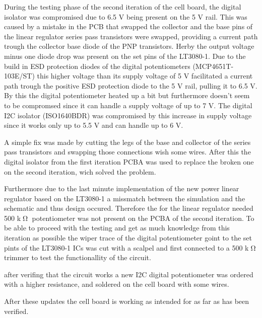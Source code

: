 
During the testing phase of the second iteration of the cell board, the digital isolator was compromised due to 6.5 V being present on the 5 V rail. This was caused by a mistake in the PCB that swapped the collector and the base pins of the linear regulator series pass transistors were swapped, providing a current path trough the collector base diode of the PNP transistors. Herby the output voltage minus one diode drop was present on the set pins of the LT3080-1. Due to the build in ESD protection diodes of the digital potentiometers (MCP4651T-103E/ST) this higher voltage than its supply voltage of 5 V facilitated a current path trough the positive ESD protection diode to the 5 V rail, pulling it to 6.5 V. By this the digital potentiometer heated up a bit but furthermore doesn't seem to be compromsed since it can handle a supply voltage of up to 7 V. The digital I2C isolator (ISO1640BDR) was compromised by this increase in supply voltage since it works only up to 5.5 V and can handle up to 6 V. 

A simple fix was made by cutting the legs of the base and collector of the series pass transistors and swapping those connections wish some wires. After this the digital isolator from the first iteration PCBA was used to replace the broken one on the second iteration, wich solved the problem.

Furthermore due to the last minute implementation of the new power linear regulator based on the LT3080-1 a missmatch between the simulation and the schematic and thus design occured. Therefore the for the linear regulator needed 500 k$\tcohm$ potentiometer was not present on the PCBA of the second iteration. To be able to proceed with the testing and get as much knowledge from this iteration as possible the wiper trace of the digital potentiometer goint to the set pints of the LT3080-1 ICs was cut with a scalpel and first connected to a 500 k$\tcohm$ trimmer to test the functionallity of the circuit.

after verifing that the circuit works a new I2C digital potentiometer was ordered with a higher resistance, and soldered on the cell board with some wires.

After these updates the cell board is working as intended for as far as has been verified.
